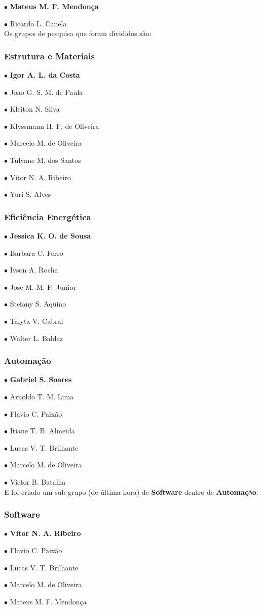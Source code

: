 $\bullet$ \textbf{Mateus M. F. Mendonça}

$\bullet$ Ricardo L. Canela\\

Os grupos de pesquisa que foram divididos são:

\subsubsection{Estrutura e Materiais}

$\bullet$ \textbf{Igor A. L. da Costa}

$\bullet$ Joao G. S. M. de Paula

$\bullet$ Kleiton N. Silva

$\bullet$ Klyssmann H. F. de Oliveira

$\bullet$ Marcelo M. de Oliveira

$\bullet$ Tulyane M. dos Santos

$\bullet$ Vitor N. A. Ribeiro

$\bullet$ Yuri S. Alves\\

\subsubsection{Eficiência Energética}

$\bullet$ \textbf{Jessica K. O. de Sousa}

$\bullet$ Barbara C. Ferro

$\bullet$ Ivson A. Rocha

$\bullet$ Jose M. M. F. Junior

$\bullet$ Stefany S. Aquino

$\bullet$ Talyta V. Cabral

$\bullet$ Walter L. Baldez\\

\subsubsection{Automação}

$\bullet$ \textbf{Gabriel S. Soares}

$\bullet$ Arnoldo T. M. Lima

$\bullet$ Flavio C. Paixão

$\bullet$ Itiane T. B. Almeida

$\bullet$ Lucas V. T. Brilhante

$\bullet$ Marcelo M. de Oliveira

$\bullet$ Victor B. Batalha\\

E foi criado um sub-grupo (de última hora) de \textbf{Software} dentro de \textbf{Automação}.

\subsubsection{Software}

$\bullet$ \textbf{Vitor N. A. Ribeiro}

$\bullet$ Flavio C. Paixão

$\bullet$ Lucas V. T. Brilhante

$\bullet$ Marcelo M. de Oliveira

$\bullet$ Mateus M. F. Mendonça\\
